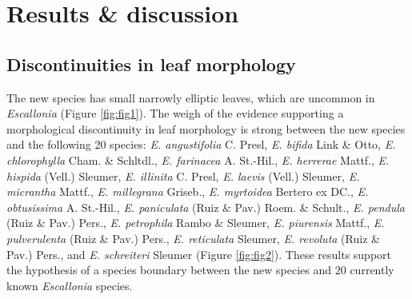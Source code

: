 \documentclass[fleqn,10pt,lineno]{wlpeerj} %
\begin{document}
\section*{Results \& discussion}

\subsection*{Discontinuities in leaf morphology}

The new species has small narrowly elliptic leaves, which are uncommon in \emph{Escallonia} (Figure \ref{fig:fig1}). The weigh of the evidence supporting a morphological discontinuity in leaf morphology is strong between the new species and the following 20 species: \emph{E. angustifolia} C. Presl, \emph{E. bifida} Link \& Otto, \emph{E. chlorophylla} Cham. \& Schltdl., \emph{E. farinacea} A. St.-Hil., \emph{E. herrerae} Mattf., \emph{E. hispida} (Vell.) Sleumer, \emph{E. illinita} C. Presl, \emph{E. laevis} (Vell.) Sleumer, \emph{E. micrantha} Mattf., \emph{E. millegrana} Griseb., \emph{E. myrtoidea} Bertero ex DC., \emph{E. obtusissima} A. St.-Hil., \emph{E. paniculata} (Ruiz \& Pav.) Roem. \& Schult., \emph{E. pendula} (Ruiz \& Pav.) Pers., \emph{E. petrophila} Rambo \& Sleumer, \emph{E. piurensis} Mattf., \emph{E. pulverulenta} (Ruiz \& Pav.) Pers., \emph{E. reticulata} Sleumer, \emph{E. revoluta} (Ruiz \& Pav.) Pers., and \emph{E. schreiteri} Sleumer (Figure \ref{fig:fig2}). These results support the hypothesis of a species boundary between the new species and 20 currently known \emph{Escallonia} species.
\end{document}
